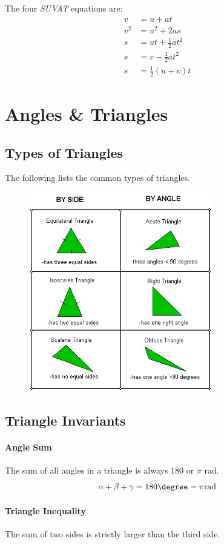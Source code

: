 The four \emph{SUVAT} equations are:
\begin{align}
v&=u+at \\
v^{2}&=u^{2}+2as 		 \\
s&=u t+\frac{1}{2}at^{2}	\\
s&=v-\frac{1}{2}at^{2}		\\
s&=\frac{1}{2}(u+v)t
\end{align}
\section{Angles \& Triangles}
\subsection{Types of Triangles}
The following lists the common types of triangles.

\begin{figure}[H]
	\centering
	\includegraphics[width=8cm]{triclass}
\end{figure}
\subsection{Triangle Invariants}
\paragraph{Angle Sum}
The sum of all angles  in a triangle is always 180\degree{} or \( \pi \) rad.
\[
	\alpha + \beta + \gamma = 180 \degree = \pi \mathrm{rad}
\]
\paragraph{Triangle Inequality}
The sum of two sides is strictly larger than the third side.

